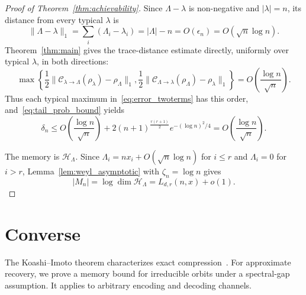 \documentclass[a4paper,onecolumn,11pt]{quantumarticle}
\def\h{\mathcal{H}}
\def\C{\mathcal{C}}
\begin{document}
\begin{proof}[Proof of Theorem~\ref{thm:achievability}]
Since $\Lambda-\lambda$ is non-negative and $|\lambda|=n$, its distance from every typical $\lambda$ is
\begin{equation}
    \|\Lambda-\lambda\|_1
    =\sum_i(\Lambda_i-\lambda_i)
    =|\Lambda|-n
    =O(\epsilon_n)
    =O(\sqrt n\log n).
\end{equation}
Theorem~\ref{thm:main} gives the trace-distance estimate directly, uniformly
over typical $\lambda$, in both directions:
\begin{equation}
\max\left\{
\frac12\|\C_{\lambda\to\Lambda}(\rho_\lambda)-\rho_{\Lambda}\|_1,
\frac12\|\C_{\Lambda\to\lambda}(\rho_{\Lambda})-\rho_\lambda\|_1
\right\}
=O\!\left(\frac{\log n}{\sqrt n}\right).
\end{equation}
Thus each typical maximum in~\eqref{eq:error_twoterms} has this order, and~\eqref{eq:tail_prob_bound} yields
\begin{equation}
    \delta_n
    \le O\!\left(\frac{\log n}{\sqrt n}\right)
    +2(n+1)^{\frac{r(r+1)}2}e^{-(\log n)^2/4}
    =O\!\left(\frac{\log n}{\sqrt n}\right).
\end{equation}

The memory is $\h_{\Lambda}$. Since
$\Lambda_i=nx_i+O(\sqrt n\log n)$ for $i\le r$ and
$\Lambda_i=0$ for $i>r$, Lemma~\ref{lem:weyl_asymptotic}
with $\zeta_n=\log n$ gives
\[
|M_n|=\log\dim\h_{\Lambda}=L_{d,r}(n,x)+o(1).
\]
\end{proof}

\section{Converse}\label{sec:converse}

The Koashi--Imoto theorem characterizes exact
compression~\cite{koashi2001compressibility,koashi2001possible}.
For approximate recovery, we prove a memory bound for irreducible
orbits under a spectral-gap assumption. It applies to arbitrary
encoding and decoding channels.
\end{document}
